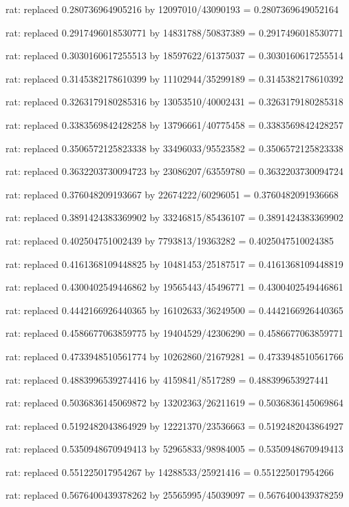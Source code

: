 \documentclass[a4paper,10pt]{article}
\begin{document}
\begin{eulernotebook}
\begin{eulercomment}
\begin{eulercomment}
\begin{eulercomment}
\begin{eulercomment}
\begin{eulercomment}
\begin{eulercomment}
\begin{eulercomment}
\begin{eulercomment}
\begin{eulercomment}
\begin{eulercomment}
\begin{eulercomment}
\begin{eulercomment}
\begin{eulercomment}
\begin{eulercomment}
\begin{eulercomment}
\begin{eulercomment}
\begin{euleroutput}
  rat: replaced 0.280736964905216 by 12097010/43090193 = 0.2807369649052164
  
  rat: replaced 0.2917496018530771 by 14831788/50837389 = 0.2917496018530771
  
  rat: replaced 0.3030160617255513 by 18597622/61375037 = 0.3030160617255514
  
  rat: replaced 0.3145382178610399 by 11102944/35299189 = 0.3145382178610392
  
  rat: replaced 0.3263179180285316 by 13053510/40002431 = 0.3263179180285318
  
  rat: replaced 0.3383569842428258 by 13796661/40775458 = 0.3383569842428257
  
  rat: replaced 0.3506572125823338 by 33496033/95523582 = 0.3506572125823338
  
  rat: replaced 0.3632203730094723 by 23086207/63559780 = 0.3632203730094724
  
  rat: replaced 0.376048209193667 by 22674222/60296051 = 0.3760482091936668
  
  rat: replaced 0.3891424383369902 by 33246815/85436107 = 0.3891424383369902
  
  rat: replaced 0.402504751002439 by 7793813/19363282 = 0.4025047510024385
  
  rat: replaced 0.4161368109448825 by 10481453/25187517 = 0.4161368109448819
  
  rat: replaced 0.4300402549446862 by 19565443/45496771 = 0.4300402549446861
  
  rat: replaced 0.4442166926440365 by 16102633/36249500 = 0.4442166926440365
  
  rat: replaced 0.4586677063859775 by 19404529/42306290 = 0.4586677063859771
  
  rat: replaced 0.4733948510561774 by 10262860/21679281 = 0.4733948510561766
  
  rat: replaced 0.4883996539274416 by 4159841/8517289 = 0.488399653927441
  
  rat: replaced 0.5036836145069872 by 13202363/26211619 = 0.5036836145069864
  
  rat: replaced 0.5192482043864929 by 12221370/23536663 = 0.5192482043864927
  
  rat: replaced 0.5350948670949413 by 52965833/98984005 = 0.5350948670949413
  
  rat: replaced 0.551225017954267 by 14288533/25921416 = 0.551225017954266
  
  rat: replaced 0.5676400439378262 by 25565995/45039097 = 0.5676400439378259
  

\end{euleroutput}
\end{eulercomment}
\end{eulercomment}
\end{eulercomment}
\end{eulercomment}
\end{eulercomment}
\end{eulercomment}
\end{eulercomment}
\end{eulercomment}
\end{eulercomment}
\end{eulercomment}
\end{eulercomment}
\end{eulercomment}
\end{eulercomment}
\end{eulercomment}
\end{eulercomment}
\end{eulercomment}
\end{eulernotebook}
\end{document}

